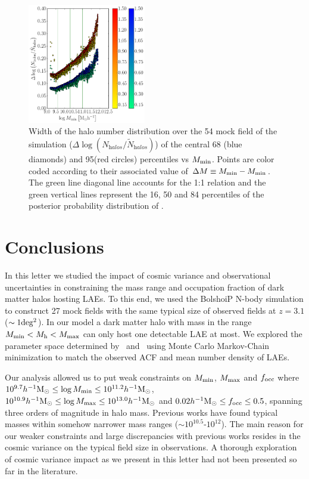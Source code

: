\documentclass{emulateapj}
\newcommand{\hMsun}{{\ifmmode{h^{-1}{\rm {M_{\odot}}}}\else{$h^{-1}{\rm{M_{\odot}}}$}\fi}}
\newcommand{\mmin}{{\ifmmode{{M_{\rm min}}}\else{${M_{\rm min}}$}\fi}}
\newcommand{\mmax}{{\ifmmode{{M_{\rm max}}}\else{${M_{\rm max}}$}\fi}}
\begin{document}

\begin{figure}
\includegraphics[width=0.46\textwidth, height=0.33\textwidth]{mmin_dfocc1.png}
\caption{Width of the halo number distribution over the 54 mock field of the simulation ($\Delta \log \left( N_{\mathrm halos}/\tilde{N}_{\mathrm halos}\right)$) of the central 68 (blue diamonds) and  95(red circles)  percentiles vs $M_{\rm min}$. Points are color coded according to their associated value of $\Delta M \equiv M_{\rm min}-M_{\rm min}$. The green line diagonal line accounts for the 1:1 relation and the green vertical lines represent  the 16, 50 and 84 percentiles  of the posterior probability distribution of \mmin.}
\label{fig:cosmicv}
\end{figure}


\section{Conclusions}

In this letter we studied the impact of cosmic variance and observational uncertainties in constraining the mass range and  occupation fraction of dark matter halos hosting  LAEs.  
To this end, we used the BolshoiP N-body simulation to construct  27 mock fields  with the same typical size  of observed fields at  $z=3.1$ ($\sim 1 {\rm deg^2}$).  
In our model a dark matter halo with mass in the range $M_{\rm min}<M_{\mathrm h}<M_{\rm   max}$ can only host one detectable LAE at most. 
We explored the parameter space determined by \mmin\ and \mmax\ using Monte Carlo Markov-Chain minimization to match the observed  ACF and mean number density of LAEs. 

Our analysis allowed us to put weak constraints on $M_{\rm min}$, $M_{\rm max}$ and $f_{\rm occ}$ where $10^{9.7}\hMsun\leq \log M_{\rm min}\leq 10^{11.2}\hMsun$, $10^{10.9}\hMsun\leq \log M_{\rm max}\leq 10^{13.0}\hMsun$ and $0.02\hMsun\leq f_{\rm occ}\leq 0.5$, spanning three orders of magnitude in halo mass.
Previous works\citep{Hayashino2004, Gawiser07,Ouchi2008,Bielby16} have found typical masses within somehow narrower mass ranges ($\sim 10^{10.5}$-$10^{12}$).  
The main reason for our weaker constraints and large discrepancies with previous works resides in the cosmic variance on the typical field size in observations. 
A thorough exploration of cosmic variance impact as we present in this letter had not been presented so far in the literature.
\end{document}
